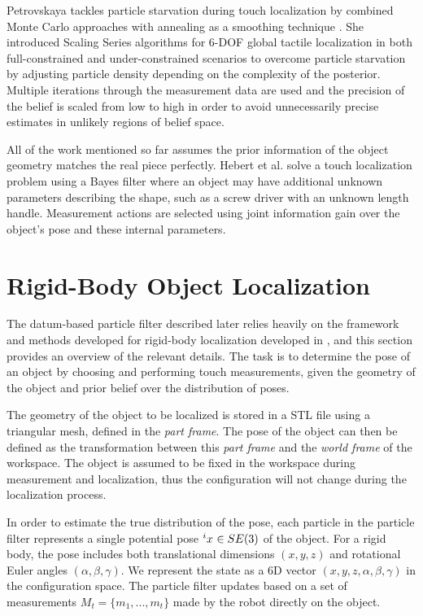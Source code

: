 \documentclass[letterpaper, 10 pt, conference]{ieeeconf}
\newcommand{\measurement}{m}
\newcommand{\measurementSet}{M}
\begin{document}
Petrovskaya tackles particle starvation during touch localization by combined Monte Carlo approaches with annealing as a smoothing technique \cite{Petrovskaya2011}. 
She introduced Scaling Series algorithms for 6-DOF global tactile localization in both full-constrained and under-constrained scenarios to overcome particle starvation by adjusting particle density depending on the complexity of the posterior. 
Multiple iterations through the measurement data are used and the precision of the belief is scaled from low to high in order to avoid unnecessarily precise estimates in unlikely regions of belief space. 


All of the work mentioned so far assumes the prior information of the object geometry matches the real piece perfectly. 
Hebert et al. \cite{Hebert2013} solve a touch localization problem using a Bayes filter where an object may have additional unknown parameters describing the shape, such as a screw driver with an unknown length handle.
Measurement actions are selected using joint information gain over the object's pose and these internal parameters.



\section{Rigid-Body Object Localization}\label{sec:rigid_body}

The datum-based particle filter described later relies heavily on the framework and methods developed for rigid-body localization developed in \cite{Saund2017}, and this section provides an overview of the relevant details. 
The task is to determine the pose of an object by choosing and performing touch measurements, given the geometry of the object and prior belief over the distribution of poses.

The geometry of the object to be localized is stored in a STL file using a triangular mesh, defined in the \textit{part frame}. The pose of the object can then be defined as the transformation between this \textit{part frame} and the \textit{world frame} of the workspace. 
The object is assumed to be fixed in the workspace during measurement and localization, thus the configuration will not change during the localization process.

In order to estimate the true distribution of the pose, each particle in the particle filter represents a single potential pose $\particle[][i] \in SE(3)$ of the object. For a rigid body, the pose includes both translational dimensions $(x,y,z)$ and rotational Euler angles $(\alpha, \beta, \gamma)$. We represent the state as a 6D vector $(x,y,z, \alpha, \beta, \gamma)$ in the configuration space. The particle filter updates based on a set of measurements $\measurementSet_t = \{\measurement_1, ..., \measurement_t\}$ made by the robot directly on the object. 
\end{document}
